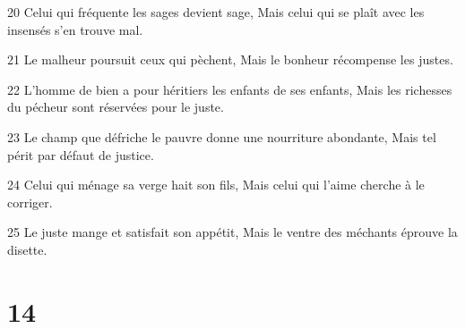 \par 20 Celui qui fréquente les sages devient sage, Mais celui qui se plaît avec les insensés s'en trouve mal.
\par 21 Le malheur poursuit ceux qui pèchent, Mais le bonheur récompense les justes.
\par 22 L'homme de bien a pour héritiers les enfants de ses enfants, Mais les richesses du pécheur sont réservées pour le juste.
\par 23 Le champ que défriche le pauvre donne une nourriture abondante, Mais tel périt par défaut de justice.
\par 24 Celui qui ménage sa verge hait son fils, Mais celui qui l'aime cherche à le corriger.
\par 25 Le juste mange et satisfait son appétit, Mais le ventre des méchants éprouve la disette.

\chapter{14}

